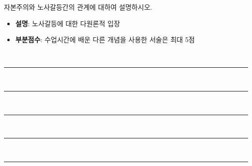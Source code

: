 \documentclass[11pt,answers]{exam} %
\begin{document}
\begin{questions}
\question[10] 자본주의와 노사갈등간의 관계에 대하여 설명하시오.
    \ifprintanswers\relax
        \begin{itemize}
            \item \textbf{설명}: 노사갈등에 대한 다원론적 입장
            \item \textbf{부분점수}: 수업시간에 배운 다른 개념을 사용한 서술은 최대 5점
        \end{itemize}
    \else
        \\[3pt]
        \rule{\linewidth}{0.4pt} \\[3pt]
        \rule{\linewidth}{0.4pt} \\[3pt]
        \rule{\linewidth}{0.4pt} \\[3pt]
        \rule{\linewidth}{0.4pt} \\[3pt]
        \rule{\linewidth}{0.4pt}
    \fi

\end{questions}
\end{document}
